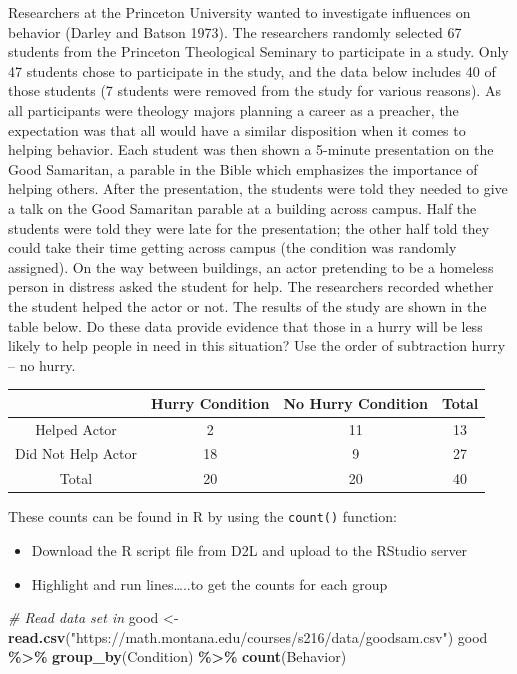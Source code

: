 \documentclass[
]{report}
\newenvironment{Shaded}{\begin{snugshade}}{\end{snugshade}}
\newcommand{\CommentTok}[1]{\textcolor[rgb]{0.56,0.35,0.01}{\textit{#1}}}
\newcommand{\FunctionTok}[1]{\textcolor[rgb]{0.13,0.29,0.53}{\textbf{#1}}}
\newcommand{\NormalTok}[1]{#1}
\newcommand{\OtherTok}[1]{\textcolor[rgb]{0.56,0.35,0.01}{#1}}
\newcommand{\SpecialCharTok}[1]{\textcolor[rgb]{0.81,0.36,0.00}{\textbf{#1}}}
\newcommand{\StringTok}[1]{\textcolor[rgb]{0.31,0.60,0.02}{#1}}
\begin{document}
Researchers at the Princeton University wanted to investigate influences on behavior (Darley and Batson 1973). The researchers randomly selected 67 students from the Princeton Theological Seminary to participate in a study. Only 47 students chose to participate in the study, and the data below includes 40 of those students (7 students were removed from the study for various reasons). As all participants were theology majors planning a career as a preacher, the expectation was that all would have a similar disposition when it comes to helping behavior. Each student was then shown a 5-minute presentation on the Good Samaritan, a parable in the Bible which emphasizes the importance of helping others. After the presentation, the students were told they needed to give a talk on the Good Samaritan parable at a building across campus. Half the students were told they were late for the presentation; the other half told they could take their time getting across campus (the condition was randomly assigned). On the way between buildings, an actor pretending to be a homeless person in distress asked the student for help. The researchers recorded whether the student helped the actor or not. The results of the study are shown in the table below. Do these data provide evidence that those in a hurry will be less likely to help people in need in this situation? Use the order of subtraction hurry -- no hurry.

\begin{center}
\begin{tabular}{|c|c|c|c|}\hline
& Hurry Condition & No Hurry Condition & Total \\ \hline
Helped Actor & 2 & 11 & 13 \\ \hline
Did Not Help Actor & 18 & 9 & 27 \\ \hline
Total & 20 & 20 & 40 \\ \hline
\end{tabular}
\end{center}

These counts can be found in R by using the \texttt{count()} function:

\begin{itemize}
\item
  Download the R script file from D2L and upload to the RStudio server
\item
  Highlight and run lines\ldots..to get the counts for each group
\end{itemize}

\begin{Shaded}
\begin{Highlighting}[]
\CommentTok{\# Read data set in}
\NormalTok{good }\OtherTok{\textless{}{-}} \FunctionTok{read.csv}\NormalTok{(}\StringTok{"https://math.montana.edu/courses/s216/data/goodsam.csv"}\NormalTok{) }
\NormalTok{good }\SpecialCharTok{\%\textgreater{}\%} \FunctionTok{group\_by}\NormalTok{(Condition) }\SpecialCharTok{\%\textgreater{}\%} \FunctionTok{count}\NormalTok{(Behavior)}
\end{Highlighting}
\end{Shaded}
\end{document}
